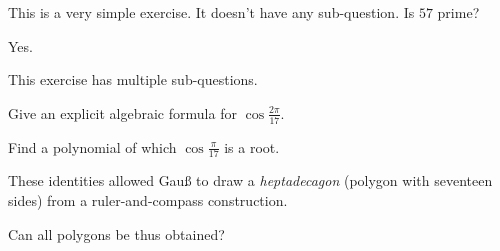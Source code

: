 \documentclass[solutions]{worksheet}
\begin{document}
\begin{exercise}

  This is a very simple exercise. It doesn't have any sub-question.
  Is $57$ prime?

\end{exercise}

\begin{solution}

  Yes.

\end{solution}

\begin{exercise}

  This exercise has multiple sub-questions.
  
  \begin{questions}

    \question Give an explicit algebraic formula for $\cos \frac {2\pi} {17}$.

    \question Find a polynomial of which $\cos \frac \pi {17}$ is a root.

  \end{questions}

  These identities allowed Gau{\ss} to draw a \emph{heptadecagon} (polygon with
  seventeen sides) from a ruler-and-compass construction.

  \begin{questions}

    \question Can all polygons be thus obtained?

  \end{questions}

\end{exercise}
\end{document}
